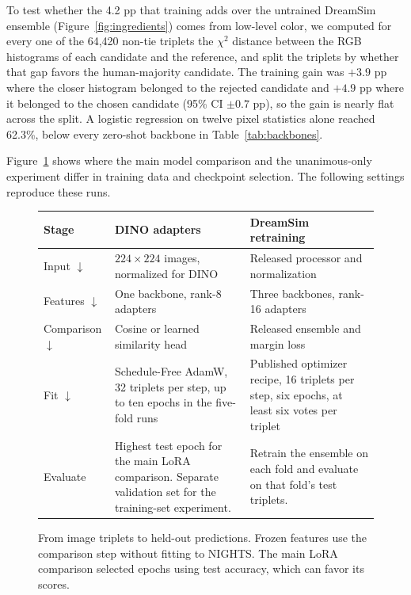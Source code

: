 To test whether the 4.2 pp that training adds over the untrained DreamSim ensemble (Figure~\ref{fig:ingredients}) comes from low-level color, we computed for every one of the 64{,}420 non-tie triplets the $\chi^2$ distance between the RGB histograms of each candidate and the reference, and split the triplets by whether that gap favors the human-majority candidate. The training gain was $+3.9$ pp where the closer histogram belonged to the rejected candidate and $+4.9$ pp where it belonged to the chosen candidate (95\% CI $\pm 0.7$ pp), so the gain is nearly flat across the split. A logistic regression on twelve pixel statistics alone reached 62.3\%, below every zero-shot backbone in Table~\ref{tab:backbones}.

\clearpage
{}
\vspace{1em}

Figure~\ref{fig:recipe} shows where the main model comparison and the unanimous-only experiment differ in training data and checkpoint selection. The following settings reproduce these runs.

\begin{figure}[!htbp]
\centering\footnotesize
\begin{tabular}{@{}p{.16\linewidth}p{.38\linewidth}p{.37\linewidth}@{}}
\toprule
Stage & DINO adapters & DreamSim retraining\\
\midrule
Input $\downarrow$ & $224\times224$ images, normalized for DINO & Released processor and normalization\\
Features $\downarrow$ & One backbone, rank-8 adapters & Three backbones, rank-16 adapters\\
Comparison $\downarrow$ & Cosine or learned similarity head & Released ensemble and margin loss\\
Fit $\downarrow$ & Schedule-Free AdamW, 32 triplets per step, up to ten epochs in the five-fold runs & Published optimizer recipe, 16 triplets per step, six epochs, at least six votes per triplet\\
Evaluate & Highest test epoch for the main LoRA comparison. Separate validation set for the training-set experiment. & Retrain the ensemble on each fold and evaluate on that fold's test triplets.\\
\bottomrule
\end{tabular}
\caption{From image triplets to held-out predictions. Frozen features use the comparison step without fitting to NIGHTS. The main LoRA comparison selected epochs using test accuracy, which can favor its scores.}
\label{fig:recipe}
\end{figure}


